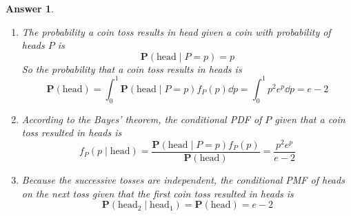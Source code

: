 \documentclass[utf8]{article}
\theoremstyle{definition}%
\theoremstyle{plain}%
\newtheorem{answer}{Answer} %
\begin{document}
\begin{answer} ~
    \begin{enumerate}[label=(\alph*)]
        \item The probability a coin toss results in head given a coin with probability of heads $P$ is
        \begin{equation}
            \mathbf{P}(\text{head} \mid P = p) = p
        \end{equation}
        So the probability that a coin toss results in heads is
        \begin{equation}
            \mathbf{P}(\text{head}) = \int_{0}^{1} \mathbf{P}(\text{head} \mid P = p)f_{P}(p) \dd{p} = \int_{0}^{1} p^2 e^p \dd{p} = e - 2
        \end{equation}
        \item According to the Bayes' theorem, the conditional PDF of $P$ given that a coin toss resulted in heads is
        \begin{equation}
            f_{P}(p \mid \text{head}) = \frac{\mathbf{P}(\text{head} \mid P = p)f_{P}(p)}{\mathbf{P}(\text{head})} = \frac{p^2 e^p}{e - 2}
        \end{equation}
        \item Because the successive tosses are independent, the conditional PMF of heads on the next toss given that the first coin toss resulted in heads is
        \begin{equation}
            \mathbf{P}(\text{head}_2 \mid \text{head}_1) = \mathbf{P}(\text{head}) = e - 2
        \end{equation}
    \end{enumerate}
\end{answer}
\end{document}
